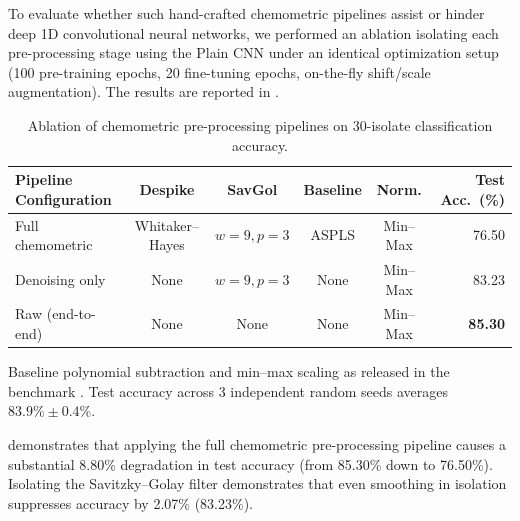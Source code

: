 \documentclass[journal,onecolumn]{IEEEtran}
\begin{document}
To evaluate whether such hand-crafted chemometric pipelines assist or hinder
deep 1D convolutional neural networks, we performed an ablation isolating each
pre-processing stage using the Plain CNN under an identical optimization setup
(100 pre-training epochs, 20 fine-tuning epochs, on-the-fly shift/scale
augmentation). The results are reported in .

\begin{table}[!t]
  \centering
  \caption{Ablation of chemometric pre-processing pipelines on 30-isolate classification accuracy.}
  \label{tab:ablation-preproc}
  \begin{threeparttable}
  \begin{tabular}{@{}lccccr@{}}
    \toprule
    Pipeline Configuration & Despike & SavGol & Baseline & Norm. & Test Acc.\ (\%) \\
    \midrule
    Full chemometric       & Whitaker--Hayes & $w{=}9, p{=}3$ & ASPLS & Min--Max & 76.50 \\
    Denoising only         & None            & $w{=}9, p{=}3$ & None  & Min--Max & 83.23 \\
    Raw (end-to-end)\tnote{a} & None         & None           & None  & Min--Max & \textbf{85.30} \\
    \bottomrule
  \end{tabular}
  \begin{tablenotes}\footnotesize
    \item[a] Baseline polynomial subtraction and min--max scaling as released in the benchmark \cite{ho2019rapid}. Test accuracy across 3 independent random seeds averages $83.9\% \pm 0.4\%$.
  \end{tablenotes}
  \end{threeparttable}
\end{table}

 demonstrates that applying the full chemometric
pre-processing pipeline causes a substantial 8.80\% degradation in test accuracy
(from 85.30\% down to 76.50\%). Isolating the Savitzky--Golay filter demonstrates
that even smoothing in isolation suppresses accuracy by 2.07\% (83.23\%).
\end{document}
